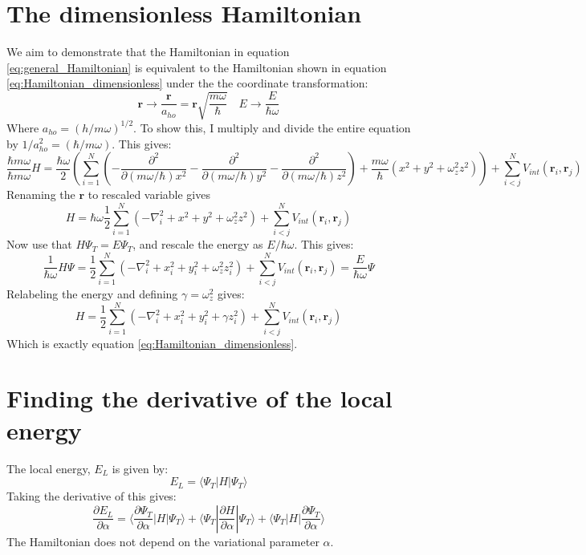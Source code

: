 \documentclass[a4paper, 10pt]{article}
\begin{document}
\begin{appendices}
\section{The dimensionless Hamiltonian}
We aim to demonstrate that the Hamiltonian in equation \ref{eq:general_Hamiltonian} is equivalent to the Hamiltonian shown in equation \ref{eq:Hamiltonian_dimensionless} under the the coordinate transformation:
\begin{equation}
\boldsymbol{r}\rightarrow \frac{\boldsymbol{r}}{a_{ho}}=\boldsymbol{r} \sqrt{\frac{m\omega}{\hbar}} \quad E\rightarrow \frac{E}{\hbar \omega}
\end{equation}
Where $a_{ho}=(h/m\omega)^{1/2}$. To show this, I multiply and divide the entire equation by $1/a_{ho}^2=(\hbar/m\omega)$. This gives:
\begin{equation}
\frac{\hbar m\omega }{\hbar m \omega}H =\frac{\hbar \omega}{2} \left(\sum_{i=1}^N \left(-\frac{\partial^2}{\partial (m\omega/\hbar) x^2}-\frac{\partial^2}{\partial (m\omega/\hbar) y^2}-\frac{\partial^2}{\partial (m\omega/\hbar) z^2}      \right)+ \frac{m\omega}{\hbar}\left(x^2+y^2+\omega_z^2 z^2\right)\right)+\sum_{i<j}^N V_{int}(\boldsymbol{r}_i, \boldsymbol{r}_j)
\end{equation}
Renaming the $\boldsymbol{r}$ to rescaled variable gives 
\begin{equation}
H=\hbar \omega \frac{1}{2}\sum_{i=1}^N \left(-\nabla^2_i+x^2+y^2+ \omega_z^2 z^2\right)+\sum_{i<j}^N V_{int}(\boldsymbol{r}_i, \boldsymbol{r}_j)
\end{equation}
Now use that $H\Psi_T=E\Psi_T$, and rescale the energy as $E/\hbar \omega$. This gives:
\begin{equation}
\frac{1}{\hbar \omega}H\Psi = \frac{1}{2}\sum_{i=1}^N\left(-\nabla^2_i +x_i^2+y_i^2+  \omega_z^2 z_i^2\right)+\sum_{i<j}^N V_{int}(\boldsymbol{r}_i, \boldsymbol{r}_j) = \frac{E}{\hbar \omega}\Psi
\end{equation}
Relabeling the energy and defining $\gamma=\omega_z^2$ gives:
\begin{equation}
H=\frac{1}{2}\sum_{i=1}^N \left(-\nabla_i^2 +x_i^2+y_i^2+\gamma z_i^2\right)+\sum_{i<j}^N V_{int}(\boldsymbol{r}_i, \boldsymbol{r}_j)
\end{equation}
Which is exactly equation \ref{eq:Hamiltonian_dimensionless}.
\section{Finding the derivative of the local energy}
The local energy, $E_L$ is given by:
\begin{equation}
E_L=\langle \Psi_T | H| \Psi_T \rangle
\end{equation}
Taking the derivative of this gives:
\begin{equation}
\frac{\partial E_L}{\partial \alpha}=\langle \frac{\partial \Psi_T}{\partial \alpha}|H|\Psi_T\rangle + \langle \Psi_T |\frac{\partial H}{\partial \alpha}	|\Psi_T\rangle + \langle \Psi_T |H|\frac{\partial \Psi_T}{\partial \alpha}\rangle
\end{equation}
The Hamiltonian does not depend on the variational parameter $\alpha$. 
\end{appendices}
\end{document}
